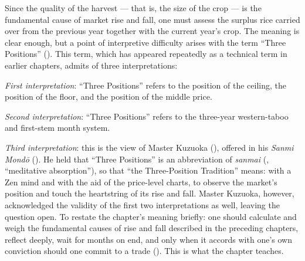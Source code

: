 \commentary
Since the quality of the harvest --- that is, the size of the
crop --- is the fundamental cause of market rise and fall, one must
assess the surplus rice carried over from the previous year together
with the current year's crop. The meaning is clear enough, but a
point of interpretive difficulty arises with the term ``Three
Positions'' (). This term, which has appeared repeatedly
as a technical term in earlier chapters, admits of three
interpretations:

\textit{First interpretation}: ``Three Positions'' refers to the position of
the ceiling, the position of the floor, and the position of the
middle price.

\textit{Second interpretation}: ``Three Positions'' refers to the three-year
western-taboo and first-stem month system.

\textit{Third interpretation}: this is the view of Master Kuzuoka
(), offered in his \textit{Sanmi Mond\=o}
(). He held that ``Three Positions'' is an abbreviation of
\textit{sanmai} (, ``meditative absorption''), so that
``the Three-Position Tradition'' means: with a Zen mind and with the
aid of the price-level charts, to observe the market's position and
touch the heartstring of its rise and fall. Master Kuzuoka, however,
acknowledged the validity of the first two interpretations as well,
leaving the question open. To restate the chapter's meaning briefly:
one should calculate and weigh the fundamental causes of rise and
fall described in the preceding chapters, reflect deeply, wait for
months on end, and only when it accords with one's own conviction
should one commit to a trade (). This is what the
chapter teaches.


